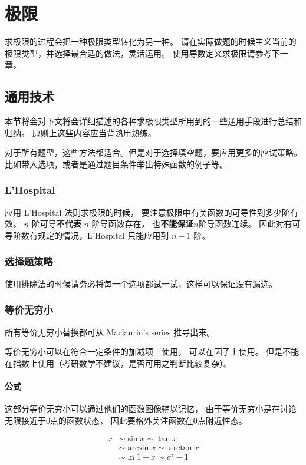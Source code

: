 \chapter{极限}

求极限的过程会把一种极限类型转化为另一种。
请在实际做题的时候主义当前的极限类型，并选择最合适的做法，灵活运用。
使用导数定义求极限请参考下一章。

\section{通用技术}

本节将会对下文将会详细描述的各种求极限类型所用到的一些通用手段进行总结和归纳。
原则上这些内容应当背熟用熟练。

对于所有题型，这些方法都适合。但是对于选择填空题，要应用更多的应试策略。
比如带入选项，或者是通过题目条件举出特殊函数的例子等。

\subsection{L'Hospital}

应用 L'Hospital 法则求极限的时候，
要注意极限中有关函数的可导性到多少阶有效。
$n$ 阶可导\textbf{不代表} $n$ 阶导函数存在，
也\textbf{不能保证}$n$阶导函数连续。
因此对有可导阶数有规定的情况，L'Hospital 只能应用到 $n-1$ 阶。

\subsection{选择题策略}

使用排除法的时候请务必将每一个选项都试一试，这样可以保证没有漏选。

\subsection{等价无穷小}  \label{super-small}
所有等价无穷小替换都可从 Maclaurin's series 推导出来。

等价无穷小可以在符合一定条件的加减项上使用，
可以在因子上使用。
但是不能在指数上使用（考研数学不建议，是否可用之判断比较复杂）。

\subsubsection{公式}
这部分等价无穷小可以通过他们的函数图像辅以记忆，
由于等价无穷小是在讨论无限接近于0点的函数状态，
因此要格外关注函数在0点附近性态。
\begin{lemma}[等价无穷小]
	\begin{align}
		x&\sim\sin{x}\sim\tan{x} \\ 
		&\sim\arcsin{x}\sim\arctan{x} \\
		&\sim\ln{1+x}\sim e^x-1
	\end{align}
\end{lemma}

